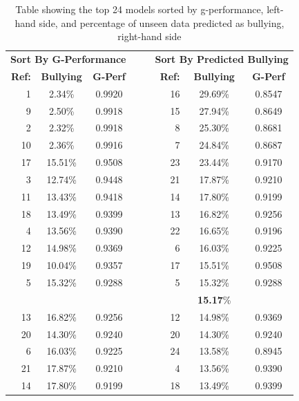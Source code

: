\begin{table}[h]
\centering
\caption[Simple performance measurement of top 24 models]{Table showing the top 24 models sorted by g-performance, left-hand side, and percentage of unseen data predicted as bullying, right-hand side}
\label{tab:chapter5:simple_initial_analysis}
\begin{tabular}{rccrlrcc}
	\toprule
	\multicolumn{3}{c}{\textbf{Sort By G-Performance}} & \multicolumn{2}{c}{\textbf{ }} & \multicolumn{3}{c}{\textbf{Sort By Predicted Bullying}} \\
	\cmidrule(r){1-3}
	\cmidrule(r){6-8}
	\textbf{Ref:} & \textbf{Bullying} & \textbf{G-Perf} & \multicolumn{2}{c}{\textbf{ }} & \textbf{Ref:} & \textbf{Bullying} & \textbf{G-Perf} \\
    \midrule
	1 & 2.34\% & 0.9920 &  &  & 16 & 29.69\% & 0.8547 \\
	9 & 2.50\% & 0.9918 &  &  & 15 & 27.94\% & 0.8649 \\
	2 & 2.32\% & 0.9918 &  &  & 8 & 25.30\% & 0.8681 \\
	10 & 2.36\% & 0.9916 &  &  & 7 & 24.84\% & 0.8687 \\
	17 & 15.51\% & 0.9508 &  &  & 23 & 23.44\% & 0.9170 \\
	3 & 12.74\% & 0.9448 &  &  & 21 & 17.87\% & 0.9210 \\
	11 & 13.43\% & 0.9418 &  &  & 14 & 17.80\% & 0.9199 \\
	18 & 13.49\% & 0.9399 &  &  & 13 & 16.82\% & 0.9256 \\
	4 & 13.56\% & 0.9390 &  &  & 22 & 16.65\% & 0.9196 \\
	12 & 14.98\% & 0.9369 &  &  & 6 & 16.03\% & 0.9225 \\
    \midrule
	\rowcolor{LightCyan}
	19 & 10.04\% & 0.9357 &  &  & 17 & 15.51\% & 0.9508 \\
	\rowcolor{LightCyan}
	5 & 15.32\% & 0.9288 &  &  & 5 & 15.32\% & 0.9288 \\
	\rowcolor{LightCyan}
	&&&&&&\textbf{15.17}\%& \\
	\rowcolor{LightCyan}
	13 & 16.82\% & 0.9256 &  &  & 12 & 14.98\% & 0.9369 \\
	\rowcolor{LightCyan}
	20 & 14.30\% & 0.9240 &  &  & 20 & 14.30\% & 0.9240 \\
	\rowcolor{LightCyan}
	6 & 16.03\% & 0.9225 &  &  & 24 & 13.58\% & 0.8945 \\
    \midrule
	21 & 17.87\% & 0.9210 &  &  & 4 & 13.56\% & 0.9390 \\
	14 & 17.80\% & 0.9199 &  &  & 18 & 13.49\% & 0.9399 \\

\end{tabular}
\end{table}
